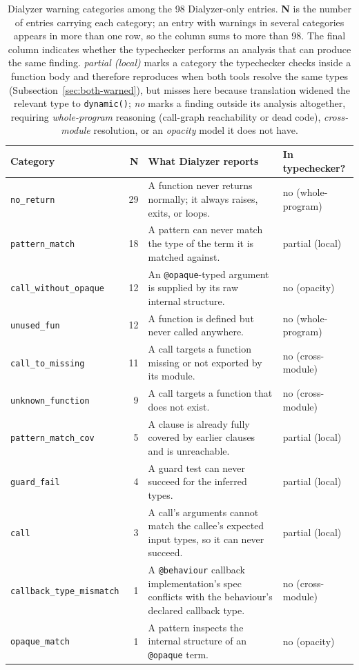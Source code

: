 \begin{table}[h]
\centering
\footnotesize
\begin{tabularx}{\textwidth}{@{}l r X l@{}}
\toprule
\textbf{Category} & \textbf{N} & \textbf{What Dialyzer reports} & \textbf{In typechecker?} \\
\midrule
\texttt{no\_return}            & 29 & A function never returns normally; it always raises, exits, or loops. & no (whole-program) \\
\texttt{pattern\_match}        & 18 & A pattern can never match the type of the term it is matched against. & partial (local) \\
\texttt{call\_without\_opaque} & 12 & An \texttt{@opaque}-typed argument is supplied by its raw internal structure. & no (opacity) \\
\texttt{unused\_fun}           & 12 & A function is defined but never called anywhere. & no (whole-program) \\
\texttt{call\_to\_missing}     & 11 & A call targets a function missing or not exported by its module. & no (cross-module) \\
\texttt{unknown\_function}     &  9 & A call targets a function that does not exist. & no (cross-module) \\
\texttt{pattern\_match\_cov}   &  5 & A clause is already fully covered by earlier clauses and is unreachable. & partial (local) \\
\texttt{guard\_fail}           &  4 & A guard test can never succeed for the inferred types. & partial (local) \\
\texttt{call}                  &  3 & A call's arguments cannot match the callee's expected input types, so it can never succeed. & partial (local) \\
\texttt{callback\_type\_mismatch} & 1 & A \texttt{@behaviour} callback implementation's spec conflicts with the behaviour's declared callback type. & no (cross-module) \\
\texttt{opaque\_match}         &  1 & A pattern inspects the internal structure of an \texttt{@opaque} term. & no (opacity) \\
\bottomrule
\end{tabularx}
\caption{Dialyzer warning categories among the 98 Dialyzer-only entries. \textbf{N} is the number of entries carrying each category; an entry with warnings in several categories appears in more than one row, so the column sums to more than 98. The final column indicates whether the typechecker performs an analysis that can produce the same finding. \emph{partial (local)} marks a category the typechecker checks inside a function body and therefore reproduces when both tools resolve the same types (Subsection~\ref{sec:both-warned}), but misses here because translation widened the relevant type to \texttt{dynamic()}; \emph{no} marks a finding outside its analysis altogether, requiring \emph{whole-program} reasoning (call-graph reachability or dead code), \emph{cross-module} resolution, or an \emph{opacity} model it does not have.}
\label{tab:dialyzer-cats}
\end{table}

